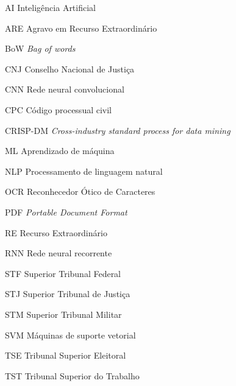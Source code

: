 \begin{siglas}
  \item[AI] Inteligência Artificial
  \item[ARE] Agravo em Recurso Extraordinário
  \item[BoW] \textit{Bag of words}
  \item[CNJ] Conselho Nacional de Justiça
  \item[CNN] Rede neural convolucional
  \item[CPC] Código processual civil
  \item[CRISP-DM] \textit{Cross-industry standard process for data mining}
  \item[ML] Aprendizado de máquina
  \item[NLP] Processamento de linguagem natural
  \item[OCR] Reconhecedor Ótico de Caracteres
  \item[PDF] \textit{Portable Document Format}
  \item[RE] Recurso Extraordinário
  \item[RNN] Rede neural recorrente
  \item[STF] Superior Tribunal Federal
  \item[STJ] Superior Tribunal de Justiça
  \item[STM] Superior Tribunal Militar
  \item[SVM] Máquinas de suporte vetorial
  \item[TSE] Tribunal Superior Eleitoral
  \item[TST] Tribunal Superior do Trabalho
\end{siglas}
